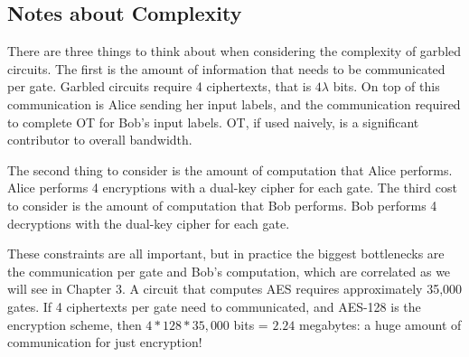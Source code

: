 \subsection{Notes about Complexity}
There are three things to think about when considering the complexity of garbled circuits.
The first is the amount of information that needs to be communicated per gate.
Garbled circuits require 4 ciphertexts, that is $4\lambda$ bits.
On top of this communication is Alice sending her input labels, and the communication required to complete OT for Bob's input labels.
OT, if used naively, is a significant contributor to overall bandwidth.

The second thing to consider is the amount of computation that Alice performs.
Alice performs 4 encryptions with a dual-key cipher for each gate.
The third cost to consider is the amount of computation that Bob performs.
Bob performs 4 decryptions with the dual-key cipher for each gate.

These constraints are all important, but in practice the biggest bottlenecks are the communication per gate and Bob's computation, which are correlated as we will see in Chapter 3.
A circuit that computes AES requires approximately 35,000 gates.
If 4 ciphertexts per gate need to communicated, and AES-128 is the encryption scheme, then $4 * 128 * 35,000$ bits = $2.24$ megabytes: a huge amount of communication for just encryption!

%

